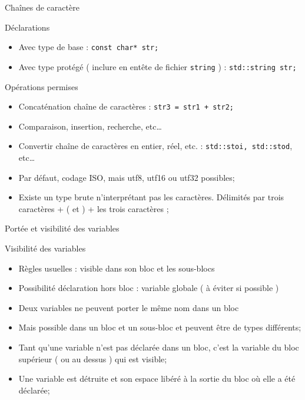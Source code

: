 \documentclass[handout,10pt]{beamer}
\newcommand{\includepartcode}[4][cpp]{

}
\begin{document}
\begin{frame}[fragile]{Chaînes de caractère}
\tiny
\begin{block}{Déclarations}
\begin{itemize}
\item Avec type de base : \lstinline$const char* str;$
\item Avec type protégé ( inclure en entête de fichier \lstinline$string$ ) :
\lstinline$std::string str;$
\end{itemize}
\end{block}
\begin{block}{Opérations permises}
\begin{itemize}
\item Concaténation chaîne de caractères : \lstinline$str3 = str1 + str2;$
\item Comparaison, insertion, recherche, etc\ldots
\item Convertir chaîne de caractères en entier, réel, etc. : \lstinline$std::stoi, std::stod$, etc\ldots
\item Par défaut, codage ISO, mais utf8, utf16 ou utf32 possibles;
\item Existe un type brute n'interprétant pas les caractères. Délimités par trois caractères + ( et ) + les trois caractères ;
\end{itemize}
\includepartcode{declarations.cpp}{60}{73}
\end{block}

\end{frame}

\begin{frame}[fragile]{Portée et visibilité des variables}
\tiny

\begin{block}{Visibilité des variables}
\begin{itemize}
\item Règles usuelles : visible dans son bloc et les sous-blocs
\item Possibilité déclaration hors bloc : variable globale ( à éviter si possible )
\item Deux variables ne peuvent porter le même nom dans un bloc
\item Mais possible dans un bloc et un sous-bloc et peuvent être de types différents;
\item Tant qu'une variable n'est pas déclarée dans un bloc, c'est la variable du bloc
supérieur ( ou au dessus ) qui est visible;
\item Une variable est détruite et son espace libéré à la sortie du bloc où elle a été déclarée;
\end{itemize}
\end{block}
\includepartcode{visibilite.cpp}{3}{14}
\end{frame}
\end{document}
